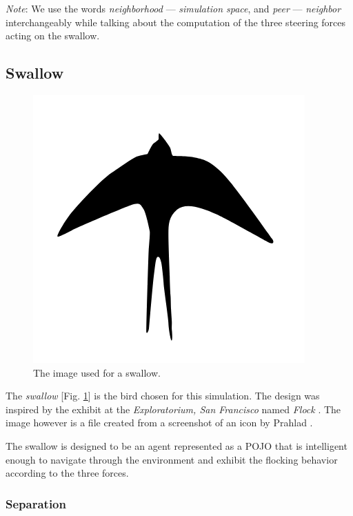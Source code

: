\documentclass[../main]{subfiles}
\begin{document}
{\em Note}: We use the words {\em neighborhood} --- {\em simulation space}, and {\em peer} --- {\em neighbor} interchangeably while talking about the computation of the three steering forces acting on the swallow.

\subsection{Swallow}
\label{swallow}

\begin{figure}
	\centering
	\includegraphics[scale=0.15]{resources/swallow.png}
	\caption{The image used for a swallow.}
	\label{swallowImg}
\end{figure}

The {\em swallow} [Fig. \ref{swallowImg}] is the bird chosen for this simulation. The design was inspired by the exhibit at the {\em Exploratorium, San Francisco} named {\em Flock} \cite{jillflock}. The image however is a  file created from a screenshot of an icon by Prahlad \cite{apSwallow}.

The swallow is designed to be an agent represented as a POJO that is intelligent enough to navigate through the environment and exhibit the flocking behavior according to the three forces.

\subsubsection{Separation}
\label{separation}
\end{document}
